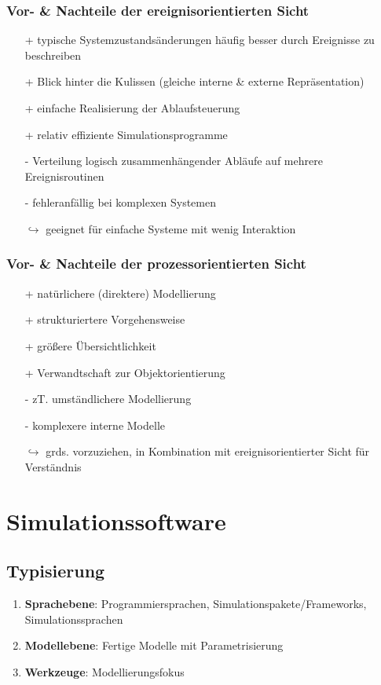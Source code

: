 \documentclass{article}
\begin{document}
\subsubsection{Vor- \& Nachteile der ereignisorientierten Sicht}
\begin{itemize}
  \item[+] typische Systemzustandsänderungen häufig besser durch Ereignisse zu beschreiben
  \item[+] Blick hinter die Kulissen (gleiche interne \& externe Repräsentation)
  \item[+] einfache Realisierung der Ablaufsteuerung
  \item[+] relativ effiziente Simulationsprogramme
  \item[-] Verteilung logisch zusammenhängender Abläufe auf mehrere Ereignisroutinen
  \item[-] fehleranfällig bei komplexen Systemen
  \item[$\hookrightarrow$] geeignet für einfache Systeme mit wenig Interaktion
\end{itemize}

\subsubsection{Vor- \& Nachteile der prozessorientierten Sicht}
\begin{itemize}
  \item[+] natürlichere (direktere) Modellierung
  \item[+] strukturiertere Vorgehensweise
  \item[+] größere Übersichtlichkeit
  \item[+] Verwandtschaft zur Objektorientierung
  \item[-] zT. umständlichere Modellierung
  \item[-] komplexere interne Modelle
  \item[$\hookrightarrow$] grds. vorzuziehen, in Kombination mit ereignisorientierter Sicht für Verständnis
\end{itemize}

\section{Simulationssoftware}\label{sec:simsoft}

\subsection{Typisierung}
\begin{enumerate}
  \item \textbf{Sprachebene}: Programmiersprachen, Simulationspakete/Frameworks, Simulationssprachen
  \item \textbf{Modellebene}: Fertige Modelle mit Parametrisierung
  \item \textbf{Werkzeuge}: Modellierungsfokus
\end{enumerate}
\end{document}
